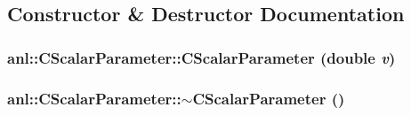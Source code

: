 \subsection{Constructor \& Destructor Documentation}
\hypertarget{classanl_1_1CScalarParameter_a566aa6d5ad62b5f70267fb98bc2945fb}{
\subsubsection[{CScalarParameter}]{\setlength{\rightskip}{0pt plus 5cm}anl::CScalarParameter::CScalarParameter (double {\em v})}}
\label{classanl_1_1CScalarParameter_a566aa6d5ad62b5f70267fb98bc2945fb}
\hypertarget{classanl_1_1CScalarParameter_ac01cbccdbc748f87cc63c9844912139e}{
\subsubsection[{$\sim$CScalarParameter}]{\setlength{\rightskip}{0pt plus 5cm}anl::CScalarParameter::$\sim$CScalarParameter ()}}
\label{classanl_1_1CScalarParameter_ac01cbccdbc748f87cc63c9844912139e}


